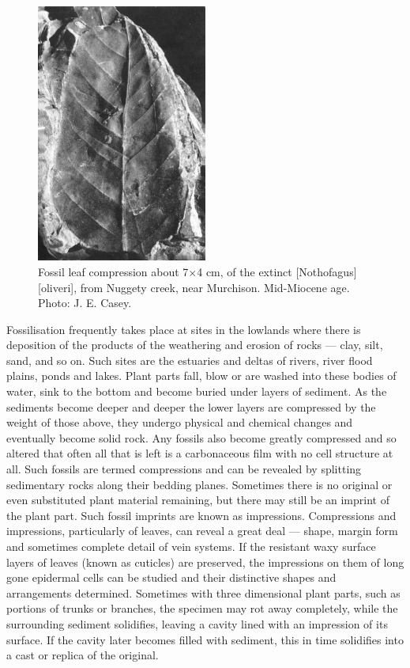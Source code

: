 \begin{figure}
	\includegraphics[width=0.5\textwidth]{graphics/figure121fossil-leaf.jpg}
	\centering
	\caption[Fossil leaf compression]{Fossil leaf compression about 7$\times$4 cm, of the extinct [Nothofagus][oliveri], from Nuggety creek, near Murchison.
	Mid-Miocene age.
	Photo: J. E. Casey.}%
	\label{fig:121fossil-leaf}
\end{figure}

Fossilisation frequently takes place at sites in the lowlands where there is deposition of the products of the weathering and erosion of rocks --- clay, silt, sand, and so on.
Such sites are the estuaries and deltas of rivers, river flood plains, ponds and lakes.
Plant parts fall, blow or are washed into these bodies of water, sink to the bottom and become buried under layers of sediment.
As the sediments become deeper and deeper the lower layers are compressed by the weight of those above, they undergo physical and chemical changes and eventually become solid rock.
Any fossils also become greatly compressed and so altered that often all that is left is a carbonaceous film with no cell structure at all.
Such fossils are termed compressions and can be revealed by splitting sedimentary rocks along their bedding planes.
Sometimes there is no original or even substituted plant material remaining, but there may still be an imprint of the plant part.
Such fossil imprints are known as impressions.
Compressions and impressions, particularly of leaves, can reveal a great deal --- shape, margin form and sometimes complete detail of vein systems.
If the resistant waxy surface layers of leaves (known as cuticles) are preserved, the impressions on them of long gone epidermal cells can be studied and their distinctive shapes and arrangements determined.
Sometimes with three dimensional plant parts, such as portions of trunks or branches, the specimen may rot away completely, while the surrounding sediment solidifies, leaving a cavity lined with an impression of its surface.
If the cavity later becomes filled with sediment, this in time solidifies into a cast or replica of the original.

